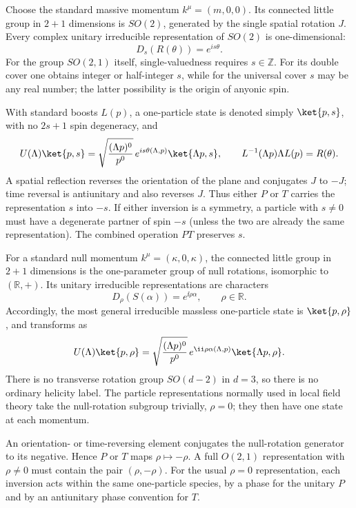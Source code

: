 \begin{enumerate}
Choose the standard massive momentum \(k^\mu=(m,0,0)\).  Its connected
little group in \(2+1\) dimensions is \(SO(2)\), generated by the single
spatial rotation \(J\).  Every complex unitary irreducible representation
of \(SO(2)\) is one-dimensional:
\[
  D_s(R(\theta))=e^{is\theta}.
\]
For the group \(SO(2,1)\) itself, single-valuedness requires
\(s\in\mathbb Z\).  For its double cover one obtains integer or
half-integer \(s\), while for the universal cover \(s\) may be any real
number; the latter possibility is the origin of anyonic spin.

With standard boosts \(L(p)\), a one-particle state is denoted simply
\(\ket{p,s}\), with no \(2s+1\) spin degeneracy, and
\[
  U(\Lambda)\ket{p,s}
   =\sqrt{\frac{(\Lambda p)^0}{p^0}}\,
     e^{is\theta(\Lambda,p)}\ket{\Lambda p,s},
  \qquad
  L^{-1}(\Lambda p)\Lambda L(p)=R(\theta).
\]
A spatial reflection reverses the orientation of the plane and conjugates
\(J\) to \(-J\); time reversal is antiunitary and also reverses \(J\).
Thus either \(P\) or \(T\) carries the representation \(s\) into
\(-s\).  If either inversion is a symmetry, a particle with \(s\ne0\)
must have a degenerate partner of spin \(-s\) (unless the two are already
the same representation).  The combined operation \(PT\) preserves \(s\).

For a standard null momentum \(k^\mu=(\kappa,0,\kappa)\), the connected
little group in \(2+1\) dimensions is the one-parameter group of null
rotations, isomorphic to \((\mathbb R,+)\).  Its unitary irreducible
representations are characters
\[
  D_\rho(S(\alpha))=e^{\ii\rho\alpha},
  \qquad \rho\in\mathbb R.
\]
Accordingly, the most general irreducible massless one-particle state is
\(\ket{p,\rho}\), and transforms as
\[
 U(\Lambda)\ket{p,\rho}
 =\sqrt{\frac{(\Lambda p)^0}{p^0}}\,
   e^{\ii\rho\alpha(\Lambda,p)}\ket{\Lambda p,\rho}.
\]
There is no transverse rotation group \(SO(d-2)\) in \(d=3\), so there is
no ordinary helicity label.  The particle representations normally used in
local field theory take the null-rotation subgroup trivially,
\(\rho=0\); they then have one state at each momentum.

An orientation- or time-reversing element conjugates the null-rotation
generator to its negative.  Hence \(P\) or \(T\) maps
\(\rho\mapsto-\rho\).  A full \(O(2,1)\) representation with
\(\rho\ne0\) must contain the pair \((\rho,-\rho)\).  For the usual
\(\rho=0\) representation, each inversion acts within the same
one-particle species, by a phase for the unitary \(P\) and by an
antiunitary phase convention for \(T\).
\end{enumerate}
